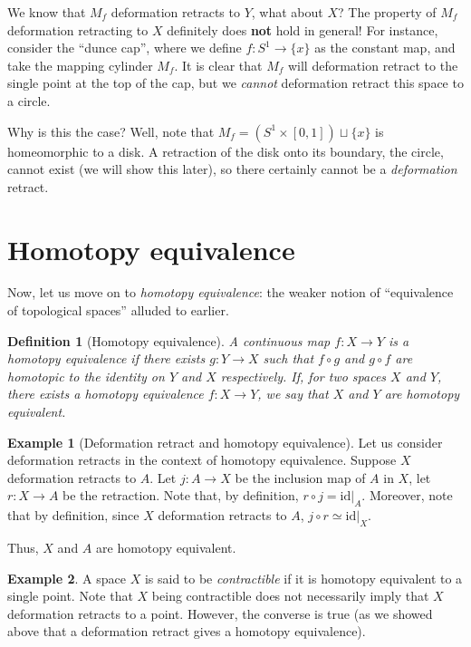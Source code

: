 \documentclass[10pt, oneside]{amsart}
\newtheorem{definition}{Definition}
\theoremstyle{definition}
\newtheorem{example}{Example}
\begin{document}
We know that $M_f$ deformation retracts to $Y$, what about $X$? The property of $M_f$ deformation retracting to $X$ definitely does \textbf{not} hold in general!
  For instance, consider the ``dunce cap'', where we define $f : S^1 \rightarrow \{x\}$
  as the constant map, and take the mapping cylinder $M_f$. It is clear that $M_f$ will deformation retract to the single point at the top of the cap, but we \emph{cannot}
  deformation retract this space to a circle.

  Why is this the case? Well, note that $M_f = (S^1 \times [0, 1]) \sqcup \{x\}$ is homeomorphic to a disk. A retraction of the disk onto its boundary, the circle, cannot exist
  (we will show this later), so there certainly cannot be a \emph{deformation} retract.
  \section{Homotopy equivalence}

  \noindent Now, let us move on to \emph{homotopy equivalence}: the weaker notion of ``equivalence of topological spaces'' alluded to earlier.

  \begin{definition}[Homotopy equivalence]
    A continuous map $f : X \rightarrow Y$ is a homotopy equivalence if there exists $g : Y \rightarrow X$ such that $f \circ g$ and $g \circ f$ are homotopic
    to the identity on $Y$ and $X$ respectively. If, for two spaces $X$ and $Y$, there exists a homotopy equivalence $f : X \rightarrow Y$, we say that
    $X$ and $Y$ are homotopy equivalent.
  \end{definition}

  \begin{example}[Deformation retract and homotopy equivalence]
    Let us consider deformation retracts in the context of homotopy equivalence. Suppose $X$ deformation retracts to $A$.
    Let $j : A \rightarrow X$ be the inclusion map of $A$ in $X$, let $r : X \rightarrow A$ be the retraction. Note that, by
    definition, $r \circ j = \text{id}|_{A}$. Moreover, note that by definition, since $X$ deformation retracts to $A$, $j \circ r \simeq \text{id}|_X$.

    Thus, $X$ and $A$ are homotopy equivalent.
    \end{example}

\begin{example}
  A space $X$ is said to be \emph{contractible} if it is homotopy equivalent to a single point. Note that $X$ being contractible does not necessarily
  imply that $X$ deformation retracts to a point. However, the converse is true (as we showed above that a deformation retract gives a homotopy equivalence).
\end{example}
\end{document}
